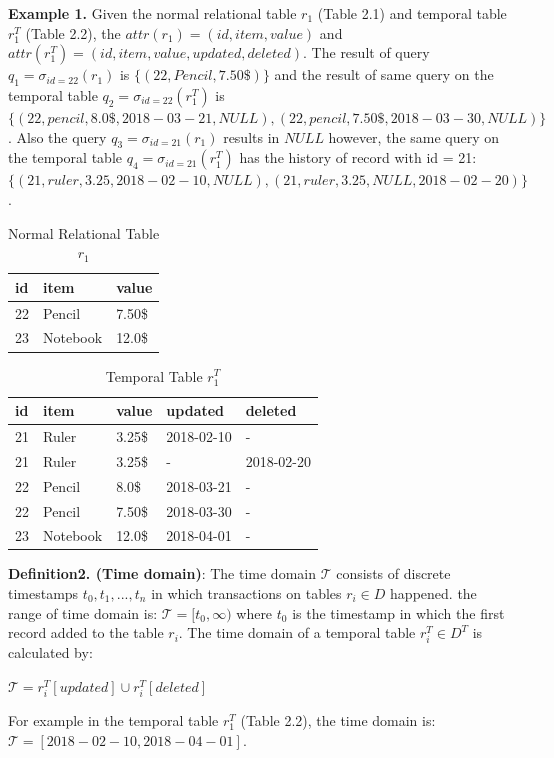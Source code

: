 \textbf{Example 1.} Given the normal relational table $r_1$ (Table 2.1) and temporal table $r_1^T$ (Table 2.2), the $attr(r_1) = (id, item, value)$ and $attr(r_1^T) = (id, item, value, updated, deleted)$. The result of query $q_1 = \sigma_{id = 22}(r_1)$ is $\{(22,Pencil,7.50\$)\}$ and the result of same query on the temporal table $q_2 = \sigma_{id = 22}(r_1^T)$ is $\{(22,pencil,8.0\$,2018-03-21,NULL),(22,pencil,7.50\$,2018-03-30,NULL)\}$. Also the query $q_3 = \sigma_{id = 21}(r_1)$ results in $NULL$ however, the same query on the temporal table $q_4 = \sigma_{id = 21}(r_1^T)$ has the history of record with id = 21: $\{(21,ruler,3.25,2018-02-10,NULL),(21,ruler,3.25,NULL,2018-02-20)\}$.
\begin{center}

\begin{table}[t]
	\centering
	\caption{Normal Relational Table $r_1$}
	\begin{tabular}{p{4cm}p{4cm}p{4cm}}
		\hline
		id & item      & value  \\ \hline
		22 & Pencil    & 7.50\$ \\
		23 & Notebook & 12.0\$   \\ \hline
	\end{tabular}
\end{table}

\begin{table}[t]
	\centering
	\caption{Temporal Table $r_1^T$}
	\begin{tabular}{p{1cm}p{2cm}p{3cm}p{3cm}p{2cm}}
		\hline
		id & item      & value  & updated  & deleted\\ \hline
		21 & Ruler    & 3.25\$  & 2018-02-10  &  - \\  
		21 & Ruler    & 3.25\$  & -  &  2018-02-20 \\
		22 & Pencil    & 8.0\$  & 2018-03-21  &  - \\
		22 & Pencil    & 7.50\$  & 2018-03-30  &  -\\
		23 & Notebook & 12.0\$  & 2018-04-01 & - \\ \hline
	\end{tabular}
\end{table} 
\end{center}


\textbf{Definition2. (Time domain)}: 
The time domain $\mathcal{T}$ consists of discrete timestamps $t_0,t_1,...,t_n$ in which transactions on tables $r_i \in D$ happened. the range of time domain is: $\mathcal{T} = [t_0, \infty)$ where $t_0$ is the timestamp in which the first record added to the table $r_i$.
The time domain of a temporal table $r_i^T \in D^T $ is calculated by:\\
\begin{center}
	$\mathcal{T} = r_i^T[updated] \cup r_i^T[deleted]$
\end{center}
For example in the temporal table $r_1^T$ (Table 2.2), the time domain is:
$\mathcal{T} = [2018-02-10,2018-04-01]$.\\

